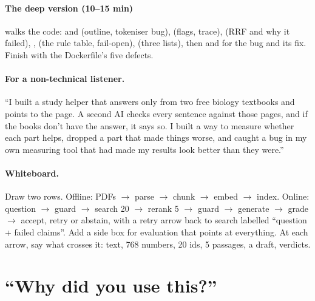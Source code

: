 \paragraph{The deep version (10--15 min)} walks the code:  and  (outline, tokeniser bug),  (flags, trace),  (RRF and why it failed), ,  (the rule table, fail-open),  (three lists), then  and  for the bug and its fix. Finish with the Dockerfile's five defects.

\paragraph{For a non-technical listener.} ``I built a study helper that answers only from two free biology textbooks and points to the page. A second AI checks every sentence against those pages, and if the books don't have the answer, it says so. I built a way to measure whether each part helps, dropped a part that made things worse, and caught a bug in my own measuring tool that had made my results look better than they were.''

\paragraph{Whiteboard.} Draw two rows. Offline: PDFs $\rightarrow$ parse $\rightarrow$ chunk $\rightarrow$ embed $\rightarrow$ index. Online: question $\rightarrow$ guard $\rightarrow$ search 20 $\rightarrow$ rerank 5 $\rightarrow$ guard $\rightarrow$ generate $\rightarrow$ grade $\rightarrow$ accept, retry or abstain, with a retry arrow back to search labelled ``question + failed claims''. Add a side box for evaluation that points at everything. At each arrow, say what crosses it: text, 768 numbers, 20 ids, 5 passages, a draft, verdicts.

\section{``Why did you use this?''}

